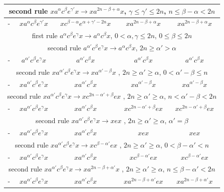 \documentclass{article}
\theoremstyle{definition}
\begin{document}
\begin{center}
\begin{tabular}{|c|c|c|c|c|}
\hline
\multicolumn{5}{|c|}{second rule $x a^{\alpha} c^\beta e^{\gamma'} x  \rightarrow x a^{2n-\beta+\alpha} x $, $\gamma \le \gamma' \le 2n$, $n\le\beta-\alpha <2n$}\\
\hline
-  &  $ x a^\alpha c^{\beta}  e^{\gamma'} x $ &  $  x  c^{\beta - \alpha} e^{\alpha+\gamma'-2n}  x $ &   $   x a^{2n-\beta+\alpha}  x  $ &  $ x a^{2n- \beta + \alpha} x $\\
\hline
\hline
\multicolumn{5}{|c|}{first rule $a^{\alpha} c^\beta e^\gamma x  \rightarrow a^{\alpha} c^\beta x $, $0<\alpha,\gamma \le 2n$, $0\le \beta \le 2n$}\\
\hline
\hline
\multicolumn{5}{|c|}{second rule $ a^{\alpha'} c^\beta e^\gamma x  \rightarrow a^\alpha c^\beta x $, $2n \ge \alpha' > \alpha$}\\
\hline
- &  $  a^{\alpha'} c^\beta e^\gamma x $ &  $  a^{\alpha'} c^\beta   x $ &   $  a^{\alpha'} c^\beta x   $ &  $ a^{\alpha'} c^\beta x  $\\
\hline
\multicolumn{5}{|c|}{second rule $x a^{\alpha'} c^\beta e^{\gamma} x  \rightarrow x a^{\alpha' -\beta}x $ , $2n\ge \alpha' \ge \alpha$,  $0< \alpha' -\beta \le n$}\\
\hline
- & $x a^{\alpha'} c^\beta e^{\gamma} x$ & $ x  a^{\alpha'} c^\beta x$ & $x a^{\alpha' -\beta}x$  & $ x a^{\alpha' -\beta}x$ \\
\hline
\multicolumn{5}{|c|}{second rule $x a^{\alpha'} c^\beta e^{\gamma} x  \rightarrow x c^{2n-\alpha' +\beta} ex $ , $2n\ge \alpha' \ge \alpha$,  $n< \alpha' -\beta <2n$}\\
\hline
- & $x a^{\alpha'} c^\beta e^{\gamma} x$ & $ x  a^{\alpha'} c^\beta x$ & $x c^{2n-\alpha' +\beta} e x$  & $ x c^{2n-\alpha' +\beta} e x$ \\
\hline
\multicolumn{5}{|c|}{second rule $x a^{\alpha'} c^\beta e^{\gamma} x  \rightarrow x  ex $ , $2n\ge \alpha' \ge \alpha$,  $ \alpha' = \beta$}\\
\hline
- & $x a^{\alpha'} c^\beta e^{\gamma} x$ & $ x  a^{\alpha'} c^\beta x$ & $x e x$  & $ x e x$ \\
\hline
\multicolumn{5}{|c|}{second rule $x a^{\alpha'} c^\beta e^{\gamma} x  \rightarrow x c^{\beta -\alpha'} ex $ , $2n\ge \alpha' \ge \alpha$,  $0<\beta - \alpha' <n$}\\
\hline
- & $x a^{\alpha'} c^\beta e^{\gamma} x$ & $ x  a^{\alpha'} c^\beta x$ & $x c^{\beta -\alpha'} e x$  & $ x c^{\beta -\alpha'} e x$ \\
\hline
\multicolumn{5}{|c|}{second rule $x a^{\alpha'} c^\beta e^{\gamma} x  \rightarrow x a^{2n-\beta +\alpha'} x $ , $2n\ge \alpha' \ge \alpha$,  $n \le \beta - \alpha' <2n$}\\
\hline
- & $x a^{\alpha'} c^\beta e^{\gamma} x$ & $ x  a^{\alpha'} c^\beta x$ & $x a^{2n-\beta +\alpha'}  e x$  & $ x a^{2n-\beta +\alpha'}  x$ \\
\hline

\end{tabular}
\end{center}
\end{document}
